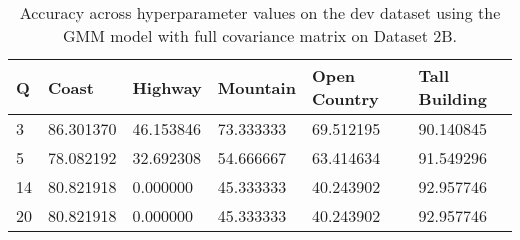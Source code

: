 \begin{table}[H]
\centering
\begin{tabular}{l l l l l l}
\hline
\hline
\textbf{Q} & \textbf{Coast} & \textbf{Highway} & \textbf{Mountain} & \textbf{Open Country} & \textbf{Tall Building} \\
\hline
\hline
3 & 86.301370 & 46.153846 & 73.333333 & 69.512195 & 90.140845 \\
5 & 78.082192 & 32.692308 & 54.666667 & 63.414634 & 91.549296 \\
14 & 80.821918 & 0.000000 & 45.333333 & 40.243902 & 92.957746 \\
20 & 80.821918 & 0.000000 & 45.333333 & 40.243902 & 92.957746\\
\hline
\end{tabular}
\caption{Accuracy across hyperparameter values on the dev dataset using the GMM model with full covariance matrix on Dataset 2B.}
\label{tab:2B_full_dev}
\end{table}
